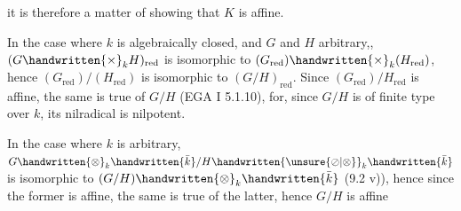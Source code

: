 
it is therefore a matter of showing that $K$ is affine.

\deleted{\unsure{)}}

In the case where $k$ is algebraically closed, and $G$ and $H$ arbitrary,, $(G\handwritten{\times}_k H)_{\mathrm{red}}$ is isomorphic to $(G_{\mathrm{red}})\handwritten{\times}_k(H_{\mathrm{red}})$, hence $(G_{\mathrm{red}})/(H_{\mathrm{red}})$ is isomorphic to $(G/H)_{\mathrm{red}}$. Since $(G_{\mathrm{red}})/H_{\mathrm{red}}$ is affine, the same is true of $G/H$ (EGA I 5.1.10), for, since $G/H$ is of finite type over $k$, its nilradical is nilpotent.

In the case where $k$ is arbitrary, $G\handwritten{\otimes}_k\handwritten{\bar{k}}/H\handwritten{\unsure{\oslash|\otimes}}_k\handwritten{\bar{k}}$ is isomorphic to $(G/H)\handwritten{\otimes}_k\handwritten{\bar{k}}$ (9.2 v)), hence since the former is affine, the same is true of the latter, hence $G/H$ is affine
\margin{\handwritten{(\qquad)}}

